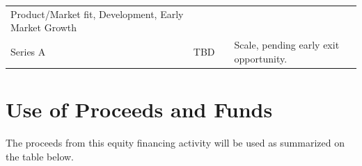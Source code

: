 \documentclass[11pt,openany]{book}
\begin{document}
\begin{longtable}[]{@{}lrcl@{}}
\begin{minipage}[t]{0.55\columnwidth}
Product/Market fit, Development, Early Market Growth\strut
\end{minipage}\tabularnewline
\begin{minipage}[t]{0.13\columnwidth}\raggedright
Series A\strut
\end{minipage} & \begin{minipage}[t]{0.10\columnwidth}\raggedleft
TBD\strut
\end{minipage} & \begin{minipage}[t]{0.10\columnwidth}\centering
\strut
\end{minipage} & \begin{minipage}[t]{0.55\columnwidth}\raggedright
Scale, pending early exit opportunity.\strut
\end{minipage}\tabularnewline
\bottomrule
\end{longtable}

\hypertarget{use-of-proceeds-and-funds}{%
\section{Use of Proceeds and Funds}\label{use-of-proceeds-and-funds}}

The proceeds from this equity financing activity will be used as
summarized on the table below.
\end{document}
